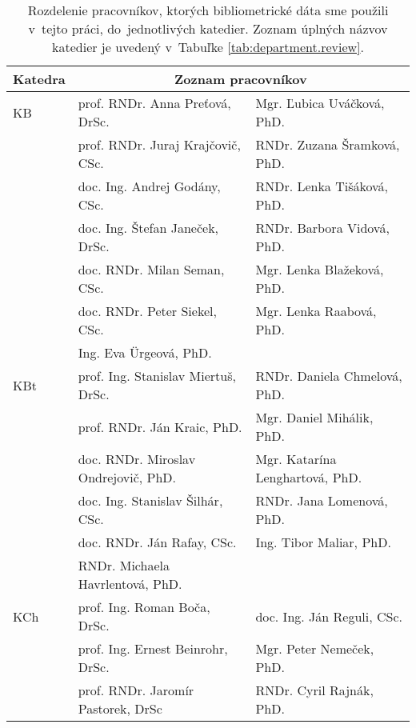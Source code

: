 \begin{table}
  \centering\small
  \caption[Rozdelenie pracovníkov do jednotlivých katedier]%
  {Rozdelenie pracovníkov, ktorých bibliometrické dáta sme použili v~tejto
    práci, do~jednotlivých katedier. Zoznam úplných názvov katedier je
    uvedený v~Tabuľke \ref{tab:department.review}.}
  \label{tab:staff.list}
  \begin{tabularx}{\textwidth}{lll}
    \toprule
    Katedra & \multicolumn{2}{c}{Zoznam pracovníkov} \\
    \midrule
    KB   & prof. RNDr. Anna Preťová, DrSc.            & Mgr. Ľubica Uváčková, PhD.        \\
         & prof. RNDr. Juraj Krajčovič, CSc.          & RNDr. Zuzana Šramková, PhD.       \\
         & doc. Ing. Andrej Godány, CSc.              & RNDr. Lenka Tišáková, PhD.        \\
         & doc. Ing. Štefan Janeček, DrSc.            & RNDr. Barbora Vidová, PhD.        \\
         & doc. RNDr. Milan Seman, CSc.               & Mgr. Lenka Blažeková, PhD.        \\
         & doc. RNDr. Peter Siekel, CSc.              & Mgr. Lenka Raabová, PhD.          \\
         & Ing. Eva Ürgeová, PhD.                     &                                   \\[2ex]
    KBt  & prof. Ing. Stanislav Miertuš, DrSc.        & RNDr. Daniela Chmelová, PhD.      \\
         & prof. RNDr. Ján Kraic, PhD.                & Mgr. Daniel Mihálik, PhD.         \\
         & doc. RNDr. Miroslav Ondrejovič, PhD.       & Mgr. Katarína Lenghartová, PhD.   \\
         & doc. Ing. Stanislav Šilhár, CSc.           & RNDr. Jana Lomenová, PhD.         \\
         & doc. RNDr. Ján Rafay, CSc.                 & Ing. Tibor Maliar, PhD.           \\
         & RNDr. Michaela Havrlentová, PhD.           &                                   \\[2ex]
    KCh  & prof. Ing. Roman Boča, DrSc.               & doc. Ing. Ján Reguli, CSc.        \\
         & prof. Ing. Ernest Beinrohr, DrSc.          & Mgr. Peter Nemeček, PhD.          \\
         & prof. RNDr. Jaromír Pastorek, DrSc         & RNDr. Cyril Rajnák, PhD.          \\

\end{tabularx}
\end{table}
